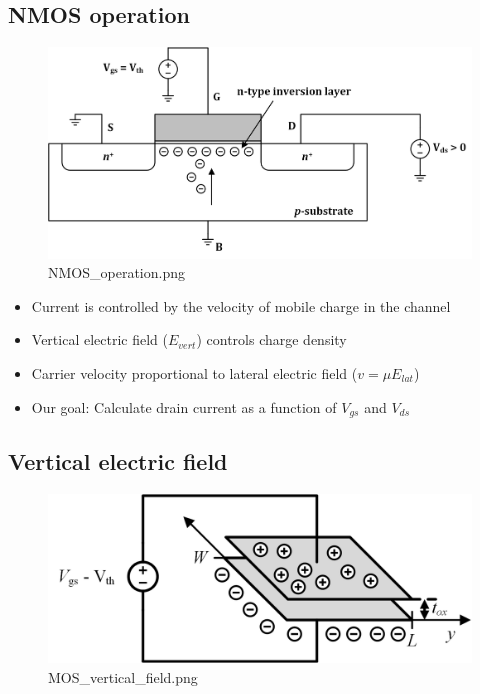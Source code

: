 \documentclass[11pt]{article}
\providecommand{\tightlist}{%
      \setlength{\itemsep}{0pt}\setlength{\parskip}{0pt}}
\begin{document}
    \hypertarget{nmos-operation}{%
\subsection{NMOS operation}\label{nmos-operation}}

    \begin{figure}
\centering
\includegraphics{NMOS_operation.png}
\caption{NMOS\_operation.png}
\end{figure}

    \begin{itemize}
\tightlist
\item
  Current is controlled by the velocity of mobile charge in the channel
\item
  Vertical electric field (\(E_{vert}\)) controls charge density
\item
  Carrier velocity proportional to lateral electric field
  (\(v=\mu E_{lat}\))
\item
  Our goal: Calculate drain current as a function of \(V_{gs}\) and
  \(V_{ds}\)
\end{itemize}

    \hypertarget{vertical-electric-field}{%
\subsection{Vertical electric field}\label{vertical-electric-field}}

    \begin{figure}
\centering
\includegraphics{MOS_vertical_field.png}
\caption{MOS\_vertical\_field.png}
\end{figure}
\end{document}
